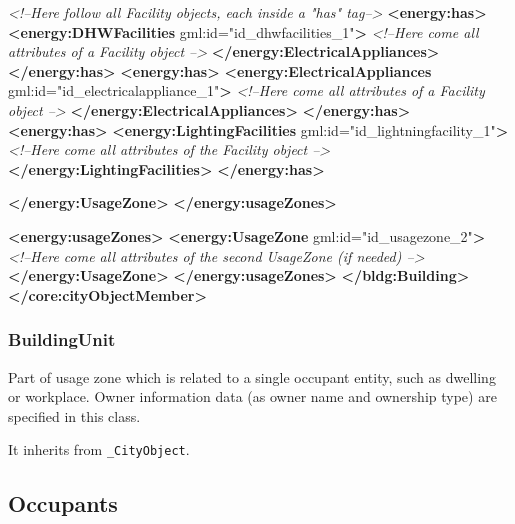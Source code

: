\documentclass[a4paper,12pt]{article}
\newenvironment{Shaded}{}{}
\newcommand{\KeywordTok}[1]{\textcolor[rgb]{0.00,0.44,0.13}{\textbf{{#1}}}}
\newcommand{\StringTok}[1]{\textcolor[rgb]{0.25,0.44,0.63}{{#1}}}
\newcommand{\CommentTok}[1]{\textcolor[rgb]{0.38,0.63,0.69}{\textit{{#1}}}}
\newcommand{\OtherTok}[1]{\textcolor[rgb]{0.00,0.44,0.13}{{#1}}}
\begin{document}
\begin{Shaded}
\begin{Highlighting}[]
                    \CommentTok{<!--Here follow all Facility objects, each inside a "has" tag-->}
                    \KeywordTok{<energy:has>}
                        \KeywordTok{<energy:DHWFacilities}\OtherTok{ gml:id=}\StringTok{"id_dhwfacilities_1"}\KeywordTok{>}
                            \CommentTok{<!--Here come all attributes of a Facility object -->}
                        \KeywordTok{</energy:ElectricalAppliances>}
                    \KeywordTok{</energy:has>}
                    \KeywordTok{<energy:has>}
                        \KeywordTok{<energy:ElectricalAppliances}\OtherTok{ gml:id=}\StringTok{"id_electricalappliance_1"}\KeywordTok{>}
                            \CommentTok{<!--Here come all attributes of a Facility object -->}
                        \KeywordTok{</energy:ElectricalAppliances>}
                    \KeywordTok{</energy:has>}
                    \KeywordTok{<energy:has>}
                        \KeywordTok{<energy:LightingFacilities}\OtherTok{ gml:id=}\StringTok{"id_lightningfacility_1"}\KeywordTok{>}
                            \CommentTok{<!--Here come all attributes of the Facility object -->}
                        \KeywordTok{</energy:LightingFacilities>}
                    \KeywordTok{</energy:has>}

                \KeywordTok{</energy:UsageZone>}
        \KeywordTok{</energy:usageZones>}

        \KeywordTok{<energy:usageZones>}
            \KeywordTok{<energy:UsageZone}\OtherTok{ gml:id=}\StringTok{"id_usagezone_2"}\KeywordTok{>}
                \CommentTok{<!--Here come all attributes of the second UsageZone (if needed) -->}
            \KeywordTok{</energy:UsageZone>}
        \KeywordTok{</energy:usageZones>}
    \KeywordTok{</bldg:Building>}
\KeywordTok{</core:cityObjectMember>}
\end{Highlighting}
\end{Shaded}

\subsubsection{BuildingUnit}\label{buildingunit}

Part of usage zone which is related to a single occupant entity, such as
dwelling or workplace. Owner information data (as owner name and
ownership type) are specified in this class.

It inherits from \texttt{\_CityObject}.

\subsection{Occupants}\label{occupants}
\end{document}

